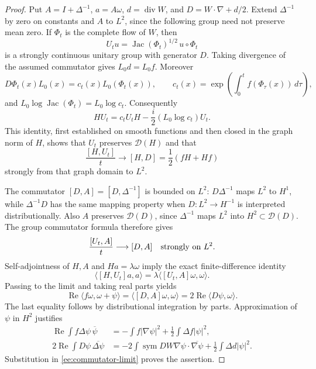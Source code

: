 \documentclass[reqno,11pt]{amsart}
\numberwithin{equation}{section}
\theoremstyle{remark}
\begin{document}
\begin{proof}
Put $A=I+\Delta^{-1}$, $a=A\omega$, $d=\operatorname{div}W$, and
$D=W\cdot\nabla+d/2$. Extend $\Delta^{-1}$ by zero on constants
and $A$ to $L^2$, since the following group need not preserve
mean zero. If $\Phi_t$ is the complete flow of $W$, then
\[
 U_t u=\operatorname{Jac}(\Phi_t)^{1/2}\,u\circ\Phi_t
\]
is a strongly continuous unitary group with generator $D$.
Taking divergence of the assumed commutator gives $L_0d=L_0f$.
Moreover
\[
 D\Phi_t(x)L_0(x)=c_t(x)L_0(\Phi_t(x)),\qquad
 c_t(x)=\exp\!\left(\int_0^t f(\Phi_\tau(x))\,d\tau\right),
\]
and $L_0\log\operatorname{Jac}(\Phi_t)=L_0\log c_t$. Consequently
\[
 HU_t=c_tU_tH-\frac i2(L_0\log c_t)U_t.
\]
This identity, first established on smooth functions and then closed
in the graph norm of $H$, shows that $U_t$ preserves $\mathcal D(H)$
and that
\[
 \frac{[H,U_t]}t\longrightarrow
 [H,D]=\frac12(fH+Hf)
\]
strongly from that graph domain to $L^2$.

The commutator $[D,A]=[D,\Delta^{-1}]$ is bounded on $L^2$:
$D\Delta^{-1}$ maps $L^2$ to $H^1$, while
$\Delta^{-1}D$ has the same mapping property when
$D:L^2\to H^{-1}$ is interpreted distributionally. Also $A$
preserves $\mathcal D(D)$, since $\Delta^{-1}$ maps $L^2$ into
$H^2\subset\mathcal D(D)$. The group commutator formula therefore
gives
\[
 \frac{[U_t,A]}t\longrightarrow[D,A]
 \quad\hbox{strongly on }L^2.
\]
Self-adjointness of $H,A$ and $Ha=\lambda\omega$ imply the exact
finite-difference identity
\[
 \langle[H,U_t]a,a\rangle
   =\lambda\langle[U_t,A]\omega,\omega\rangle.
\]
Passing to the limit and taking real parts yields
\begin{equation}\label{ee:commutator-limit}
 \operatorname{Re}\langle f\omega,\omega+\psi\rangle
   =\langle[D,A]\omega,\omega\rangle
   =2\operatorname{Re}\langle D\psi,\omega\rangle.
\end{equation}
The last equality follows by distributional integration by parts.
Approximation of $\psi$ in
$H^2$ justifies
\begin{align*}
 \operatorname{Re}\int f\Delta\psi\,\overline\psi
   &=-\int f|\nabla\psi|^2+\frac12\int\Delta f|\psi|^2,\\
 2\operatorname{Re}\int D\psi\,\overline{\Delta\psi}
   &=-2\int\operatorname{sym}DW\nabla\psi\cdot\overline{\nabla\psi}
       +\frac12\int\Delta d|\psi|^2.
\end{align*}
Substitution in \eqref{ee:commutator-limit} proves the assertion.
\end{proof}
\end{document}
